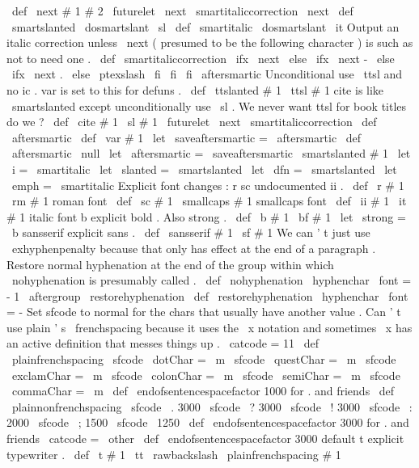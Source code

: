{{{%
{
\
def
\
next
{
{
#
1
#
2
}
\
futurelet
\
next
\
smartitaliccorrection
}
}
%
\
next
}
\
def
\
smartslanted
{
\
dosmartslant
\
sl
}
\
def
\
smartitalic
{
\
dosmartslant
\
it
}
%
Output
an
italic
correction
unless
\
next
(
presumed
to
be
the
following
%
character
)
is
such
as
not
to
need
one
.
\
def
\
smartitaliccorrection
{
%
\
ifx
\
next
%
\
else
\
ifx
\
next
-
%
\
else
\
ifx
\
next
.
%
\
else
\
ptexslash
\
fi
\
fi
\
fi
\
aftersmartic
}
%
Unconditional
use
\
ttsl
and
no
ic
.
var
is
set
to
this
for
defuns
.
\
def
\
ttslanted
#
1
{
{
\
ttsl
#
1
}
}
%
cite
is
like
\
smartslanted
except
unconditionally
use
\
sl
.
We
never
want
%
ttsl
for
book
titles
do
we
?
\
def
\
cite
#
1
{
{
\
sl
#
1
}
\
futurelet
\
next
\
smartitaliccorrection
}
\
def
\
aftersmartic
{
}
\
def
\
var
#
1
{
%
\
let
\
saveaftersmartic
=
\
aftersmartic
\
def
\
aftersmartic
{
\
null
\
let
\
aftersmartic
=
\
saveaftersmartic
}
%
\
smartslanted
{
#
1
}
%
}
\
let
\
i
=
\
smartitalic
\
let
\
slanted
=
\
smartslanted
\
let
\
dfn
=
\
smartslanted
\
let
\
emph
=
\
smartitalic
%
Explicit
font
changes
:
r
sc
undocumented
ii
.
\
def
\
r
#
1
{
{
\
rm
#
1
}
}
%
roman
font
\
def
\
sc
#
1
{
{
\
smallcaps
#
1
}
}
%
smallcaps
font
\
def
\
ii
#
1
{
{
\
it
#
1
}
}
%
italic
font
%
b
explicit
bold
.
Also
strong
.
\
def
\
b
#
1
{
{
\
bf
#
1
}
}
\
let
\
strong
=
\
b
%
sansserif
explicit
sans
.
\
def
\
sansserif
#
1
{
{
\
sf
#
1
}
}
%
We
can
'
t
just
use
\
exhyphenpenalty
because
that
only
has
effect
at
%
the
end
of
a
paragraph
.
Restore
normal
hyphenation
at
the
end
of
the
%
group
within
which
\
nohyphenation
is
presumably
called
.
%
\
def
\
nohyphenation
{
\
hyphenchar
\
font
=
-
1
\
aftergroup
\
restorehyphenation
}
\
def
\
restorehyphenation
{
\
hyphenchar
\
font
=
-
}
%
Set
sfcode
to
normal
for
the
chars
that
usually
have
another
value
.
%
Can
'
t
use
plain
'
s
\
frenchspacing
because
it
uses
the
\
x
notation
and
%
sometimes
\
x
has
an
active
definition
that
messes
things
up
.
%
\
catcode
=
11
\
def
\
plainfrenchspacing
{
%
\
sfcode
\
dotChar
=
\
m
\
sfcode
\
questChar
=
\
m
\
sfcode
\
exclamChar
=
\
m
\
sfcode
\
colonChar
=
\
m
\
sfcode
\
semiChar
=
\
m
\
sfcode
\
commaChar
=
\
m
\
def
\
endofsentencespacefactor
{
1000
}
%
for
.
and
friends
}
\
def
\
plainnonfrenchspacing
{
%
\
sfcode
\
.
3000
\
sfcode
\
?
3000
\
sfcode
\
!
3000
\
sfcode
\
:
2000
\
sfcode
\
;
1500
\
sfcode
\
1250
\
def
\
endofsentencespacefactor
{
3000
}
%
for
.
and
friends
}
\
catcode
=
\
other
\
def
\
endofsentencespacefactor
{
3000
}
%
default
%
t
explicit
typewriter
.
\
def
\
t
#
1
{
%
{
\
tt
\
rawbackslash
\
plainfrenchspacing
#
1
}
%
}}}
